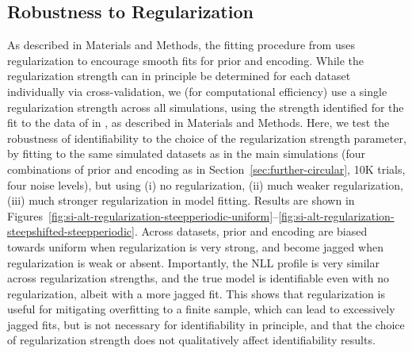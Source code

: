 \documentclass[si.tex]{subfiles}
\begin{document}




\clearpage
\newpage

\subsection{Robustness to Regularization}\label{sec:robustness-reg}
As described in Materials and Methods, the fitting procedure from \citet{hahn2024unifying} uses regularization to encourage smooth fits for prior and encoding.
While the regularization strength can in principle be determined for each dataset individually via cross-validation, we (for computational efficiency) use a single regularization strength across all simulations, using the strength identified for the fit to the data of \citet{deGardelle2010AnOI} in \citet{hahn2024unifying}, as described in Materials and Methods.
Here, we test the robustness of identifiability to the choice of the regularization strength parameter, by fitting to the same simulated datasets as in the main simulations (four combinations of prior and encoding as in Section~\ref{sec:further-circular}, 10K trials, four noise levels), but using (i) no regularization, (ii) much weaker regularization, (iii) much stronger regularization in model fitting.
Results are shown in Figures~\ref{fig:si-alt-regularization-steepperiodic-uniform}--\ref{fig:si-alt-regularization-steepshifted-steepperiodic}.
Across datasets, prior and encoding are biased towards uniform when regularization is very strong, and become jagged when regularization is weak or absent.
Importantly, the NLL profile is very similar across regularization strengths, and the true model is identifiable even with no regularization, albeit with a more jagged fit.
This shows that regularization is useful for mitigating overfitting to a finite sample, which can lead to excessively jagged fits, but is not necessary for identifiability in principle, and that the choice of regularization strength does not qualitatively affect identifiability results.



\clearpage
\end{document}
